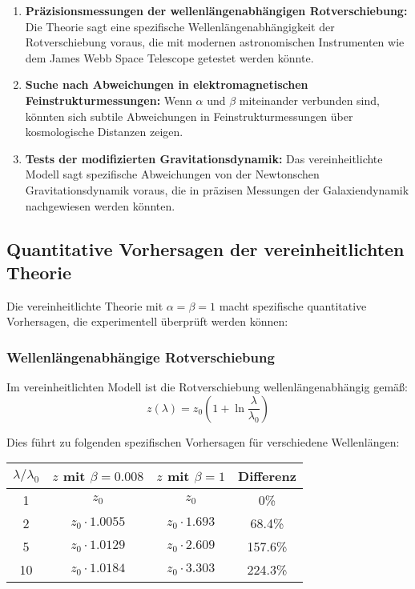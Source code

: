 \documentclass[12pt,a4paper]{article}
\begin{document}
	\begin{enumerate}
		\item \textbf{Präzisionsmessungen der wellenlängenabhängigen Rotverschiebung:} Die Theorie sagt eine spezifische Wellenlängenabhängigkeit der Rotverschiebung voraus, die mit modernen astronomischen Instrumenten wie dem James Webb Space Telescope getestet werden könnte.
		
		\item \textbf{Suche nach Abweichungen in elektromagnetischen Feinstrukturmessungen:} Wenn $\alpha$ und $\beta$ miteinander verbunden sind, könnten sich subtile Abweichungen in Feinstrukturmessungen über kosmologische Distanzen zeigen.
		
		\item \textbf{Tests der modifizierten Gravitationsdynamik:} Das vereinheitlichte Modell sagt spezifische Abweichungen von der Newtonschen Gravitationsdynamik voraus, die in präzisen Messungen der Galaxiendynamik nachgewiesen werden könnten.
	\end{enumerate}
	
	\subsection{Quantitative Vorhersagen der vereinheitlichten Theorie}
	
	Die vereinheitlichte Theorie mit $\alpha = \beta = 1$ macht spezifische quantitative Vorhersagen, die experimentell überprüft werden können:
	
	\subsubsection{Wellenlängenabhängige Rotverschiebung}
	
	Im vereinheitlichten Modell ist die Rotverschiebung wellenlängenabhängig gemäß:
	\begin{equation}
		z(\lambda) = z_0 \left(1 + \ln \frac{\lambda}{\lambda_0}\right)
	\end{equation}
	
	Dies führt zu folgenden spezifischen Vorhersagen für verschiedene Wellenlängen:
	
	\begin{center}
		\begin{tabular}{|c|c|c|c|}
			\hline
			$\lambda/\lambda_0$ & $z$ mit $\beta = 0.008$ & $z$ mit $\beta = 1$ & Differenz \\
			\hline
			1 & $z_0$ & $z_0$ & 0\% \\
			2 & $z_0 \cdot 1.0055$ & $z_0 \cdot 1.693$ & 68.4\% \\
			5 & $z_0 \cdot 1.0129$ & $z_0 \cdot 2.609$ & 157.6\% \\
			10 & $z_0 \cdot 1.0184$ & $z_0 \cdot 3.303$ & 224.3\% \\
			\hline
		\end{tabular}
	\end{center}
	
\end{document}

